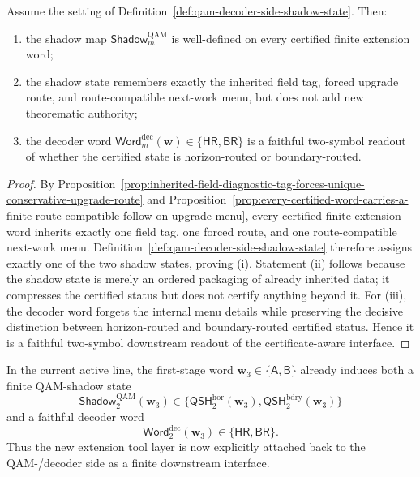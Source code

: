 \begin{proposition}
\label{prop:qam-decoder-side-shadow-is-a-faithful-finite-downstream-image-of-the-certificate-aware-interface}
Assume the setting of Definition~\ref{def:qam-decoder-side-shadow-state}. Then:
\begin{enumerate}[label=(\roman*)]
 \item the shadow map \(\mathsf{Shadow}^{\mathrm{QAM}}_{m}\) is well-defined on every certified finite extension word;
 \item the shadow state remembers exactly the inherited field tag, forced upgrade route, and route-compatible next-work menu, but does not add new theorematic authority;
 \item the decoder word \(\mathsf{Word}^{\mathrm{dec}}_{m}(\mathbf w)\in\{\mathsf{HR},\mathsf{BR}\}\) is a faithful two-symbol readout of whether the certified state is horizon-routed or boundary-routed.
\end{enumerate}
\end{proposition}

\begin{proof}
By Proposition~\ref{prop:inherited-field-diagnostic-tag-forces-unique-conservative-upgrade-route} and Proposition~\ref{prop:every-certified-word-carries-a-finite-route-compatible-follow-on-upgrade-menu}, every certified finite extension word inherits exactly one field tag, one forced route, and one route-compatible next-work menu. Definition~\ref{def:qam-decoder-side-shadow-state} therefore assigns exactly one of the two shadow states, proving (i). Statement (ii) follows because the shadow state is merely an ordered packaging of already inherited data; it compresses the certified status but does not certify anything beyond it. For (iii), the decoder word forgets the internal menu details while preserving the decisive distinction between horizon-routed and boundary-routed certified status. Hence it is a faithful two-symbol downstream readout of the certificate-aware interface.
\end{proof}

\begin{corollary}
\label{cor:present-sigma3-package-already-induces-a-first-explicit-qam-decoder-side-shadow}
In the current active line, the first-stage word \(\mathbf w_3\in\{\mathsf A,\mathsf B\}\) already induces both a finite QAM-shadow state
\[
 \mathsf{Shadow}^{\mathrm{QAM}}_{2}(\mathbf w_3)
 \in
 \{\mathsf{QSH}^{\mathrm{hor}}_{2}(\mathbf w_3),\mathsf{QSH}^{\mathrm{bdry}}_{2}(\mathbf w_3)\}
\]
and a faithful decoder word
\[
 \mathsf{Word}^{\mathrm{dec}}_{2}(\mathbf w_3)
 \in
 \{\mathsf{HR},\mathsf{BR}\}.
\]
Thus the new extension tool layer is now explicitly attached back to the QAM-/decoder side as a finite downstream interface.
\end{corollary}

